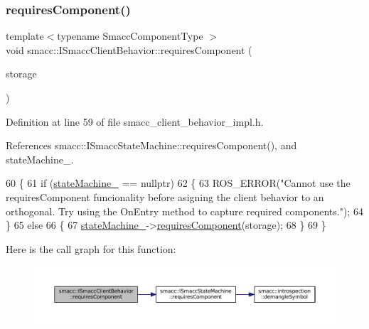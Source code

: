 \mbox{\label{classsmacc_1_1ISmaccClientBehavior_a19c6d658c8e809bb93bfdc9b639a3ac3}} 
\subsubsection{\texorpdfstring{requires\+Component()}{requiresComponent()}}
{\footnotesize\ttfamily template$<$typename Smacc\+Component\+Type $>$ \\
void smacc\+::\+I\+Smacc\+Client\+Behavior\+::requires\+Component (\begin{DoxyParamCaption}\item[{Smacc\+Component\+Type $\ast$\&}]{storage }\end{DoxyParamCaption})}



Definition at line 59 of file smacc\+\_\+client\+\_\+behavior\+\_\+impl.\+h.



References smacc\+::\+I\+Smacc\+State\+Machine\+::requires\+Component(), and state\+Machine\+\_\+.


\begin{DoxyCode}
60 \{
61     \textcolor{keywordflow}{if} (\hyperlink{classsmacc_1_1ISmaccClientBehavior_a0fea65db292a8bb3dfba3e5840491d79}{stateMachine\_} == \textcolor{keyword}{nullptr})
62     \{
63         ROS\_ERROR(\textcolor{stringliteral}{"Cannot use the requiresComponent funcionality before asigning the client behavior to an
       orthogonal. Try using the OnEntry method to capture required components."});
64     \}
65     \textcolor{keywordflow}{else}
66     \{
67         \hyperlink{classsmacc_1_1ISmaccClientBehavior_a0fea65db292a8bb3dfba3e5840491d79}{stateMachine\_}->\hyperlink{classsmacc_1_1ISmaccStateMachine_aa6b25e28f3bce24c4b356dc865a9eb7b}{requiresComponent}(storage);
68     \}
69 \}
\end{DoxyCode}
Here is the call graph for this function\+:
\nopagebreak
\begin{figure}[H]
\begin{center}
\leavevmode
\includegraphics[width=350pt]{classsmacc_1_1ISmaccClientBehavior_a19c6d658c8e809bb93bfdc9b639a3ac3_cgraph}
\end{center}
\end{figure}
\mbox{\label{classsmacc_1_1ISmaccClientBehavior_a1078de57f291301cc2829c3548fa5ea5}} 
